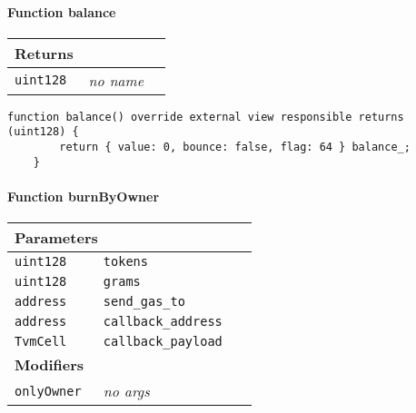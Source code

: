 \paragraph{Function balance}


\ifsoltables
\noindent\begin{tabular}{|l|l|p{5cm}|}\hline
\multicolumn{3}{|l|}{\bf Returns}\\\hline
\tt uint128 & {\em no name} &\\\hline
\end{tabular}
\fi

\vspace{2cm}

\begin{lstlisting}[firstnumber=58]
    function balance() override external view responsible returns (uint128) {
        return { value: 0, bounce: false, flag: 64 } balance_;
    }
\end{lstlisting}

\paragraph{Function burnByOwner}


\ifsoltables
\noindent\begin{tabular}{|l|l|p{5cm}|}\hline
\multicolumn{3}{|l|}{\bf Parameters}\\\hline
\tt uint128 & \tt tokens &\\\hline
\tt uint128 & \tt grams &\\\hline
\tt address & \tt send\_{}gas\_{}to &\\\hline
\tt address & \tt callback\_{}address &\\\hline
\tt TvmCell & \tt callback\_{}payload &\\\hline
\multicolumn{3}{|l|}{\bf Modifiers}\\\hline
\tt onlyOwner & {\em no args} &\\\hline
\end{tabular}
\fi

\vspace{2cm}

